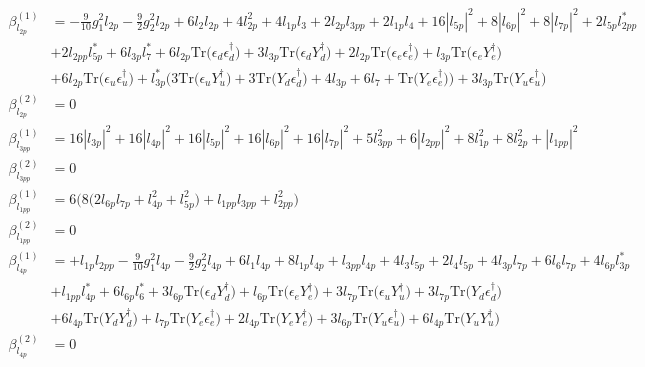 {\begin{align}
\beta_{l_{2p}}^{(1)} & =  
-\frac{9}{10} g_{1}^{2} l_{2p} -\frac{9}{2} g_{2}^{2} l_{2p} +6 l_2 l_{2p} +4 l_{2p}^{2} +4 l_{1p} l_3 +2 l_{2p} l_{3pp} +2 l_{1p} l_4 +16 |l_{5p}|^2 +8 |l_{6p}|^2 +8 |l_{7p}|^2 +2 l_{5p} l_{2pp}^* \nonumber \\ 
 &+2 l_{2pp} l_{5p}^* +6 l_{3p} l_7^* +6 l_{2p} \mbox{Tr}\Big({\epsilon_d  \epsilon_{d}^{\dagger}}\Big) +3 l_{3p} \mbox{Tr}\Big({\epsilon_d  Y_{d}^{\dagger}}\Big) +2 l_{2p} \mbox{Tr}\Big({\epsilon_e  \epsilon_{e}^{\dagger}}\Big) +l_{3p} \mbox{Tr}\Big({\epsilon_e  Y_{e}^{\dagger}}\Big) \nonumber \\ 
 &+6 l_{2p} \mbox{Tr}\Big({\epsilon_u  \epsilon_{u}^{\dagger}}\Big) +l_{3p}^* \Big(3 \mbox{Tr}\Big({\epsilon_u  Y_{u}^{\dagger}}\Big)  + 3 \mbox{Tr}\Big({Y_d  \epsilon_{d}^{\dagger}}\Big)  + 4 l_{3p}  + 6 l_7  + \mbox{Tr}\Big({Y_e  \epsilon_{e}^{\dagger}}\Big)\Big)+3 l_{3p} \mbox{Tr}\Big({Y_u  \epsilon_{u}^{\dagger}}\Big) \\ 
\beta_{l_{2p}}^{(2)} & =  
0\\ 
\beta_{l_{3pp}}^{(1)} & =  
16 |l_{3p}|^2  + 16 |l_{4p}|^2  + 16 |l_{5p}|^2  + 16 |l_{6p}|^2  + 16 |l_{7p}|^2  + 5 l_{3pp}^{2}  + 6 |l_{2pp}|^2  + 8 l_{1p}^{2}  + 8 l_{2p}^{2}  + |l_{1pp}|^2\\ 
\beta_{l_{3pp}}^{(2)} & =  
0\\ 
\beta_{l_{1pp}}^{(1)} & =  
6 \Big(8 \Big(2 l_{6p} l_{7p}  + l_{4p}^{2} + l_{5p}^{2}\Big) + l_{1pp} l_{3pp}  + l_{2pp}^{2}\Big)\\ 
\beta_{l_{1pp}}^{(2)} & =  
0\\ 
\beta_{l_{4p}}^{(1)} & =  
+l_{1p} l_{2pp} -\frac{9}{10} g_{1}^{2} l_{4p} -\frac{9}{2} g_{2}^{2} l_{4p} +6 l_1 l_{4p} +8 l_{1p} l_{4p} +l_{3pp} l_{4p} +4 l_3 l_{5p} +2 l_4 l_{5p} +4 l_{3p} l_{7p} +6 l_6 l_{7p} +4 l_{6p} l_{3p}^* \nonumber \\ 
 &+l_{1pp} l_{4p}^* +6 l_{6p} l_6^* +3 l_{6p} \mbox{Tr}\Big({\epsilon_d  Y_{d}^{\dagger}}\Big) +l_{6p} \mbox{Tr}\Big({\epsilon_e  Y_{e}^{\dagger}}\Big) +3 l_{7p} \mbox{Tr}\Big({\epsilon_u  Y_{u}^{\dagger}}\Big) +3 l_{7p} \mbox{Tr}\Big({Y_d  \epsilon_{d}^{\dagger}}\Big) \nonumber \\ 
 &+6 l_{4p} \mbox{Tr}\Big({Y_d  Y_{d}^{\dagger}}\Big) +l_{7p} \mbox{Tr}\Big({Y_e  \epsilon_{e}^{\dagger}}\Big) +2 l_{4p} \mbox{Tr}\Big({Y_e  Y_{e}^{\dagger}}\Big) +3 l_{6p} \mbox{Tr}\Big({Y_u  \epsilon_{u}^{\dagger}}\Big) +6 l_{4p} \mbox{Tr}\Big({Y_u  Y_{u}^{\dagger}}\Big) \\ 
\beta_{l_{4p}}^{(2)} & =  
0\\ 

\end{align}}
